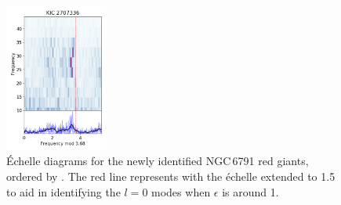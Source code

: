 \begin{figure}
        \includegraphics[width=0.3\textwidth]{Chapter5/2707336_echelle.png}
    \caption[\'Echelle diagrams for the newly identified cluster red giants in NGC\,6791 (I)]{\'Echelle diagrams for the newly identified NGC\,6791 red giants, ordered by \numax{}. The red line represents \dnu{} with the \'echelle extended to 1.5 \dnu{} to aid in identifying the $l = 0$ modes when $\epsilon$ is around 1.}
    \label{fig:echelle_new_6791}
\end{figure}


